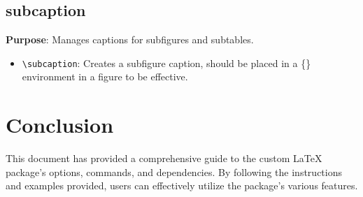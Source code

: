 \documentclass[12pt,twoside]{report}
\begin{document}
\subsection{subcaption}
\textbf{Purpose}: Manages captions for subfigures and subtables.
\begin{itemize}
    \item \verb|\subcaption|: Creates a subfigure caption, should be placed in a \{\} environment in a figure to be effective.
\end{itemize}

\section{Conclusion}
This document has provided a comprehensive guide to the custom LaTeX package's options, commands, and dependencies. By following the instructions and examples provided, users can effectively utilize the package's various features.
\end{document}
